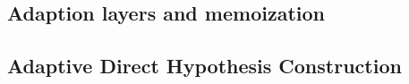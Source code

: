 \subsection{Adaption layers and memoization} \label{subsec_memoization}

\subsection{Adaptive Direct Hypothesis Construction} \label{subsec_adaptivedhc}

